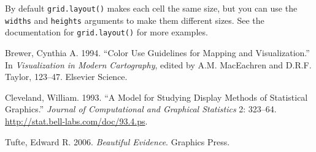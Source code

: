 By default \texttt{grid.layout()} makes each cell the same size, but you
can use the \texttt{widths} and \texttt{heights} arguments to make them
different sizes. See the documentation for \texttt{grid.layout()} for
more examples.

Brewer, Cynthia A. 1994. ``Color Use Guidelines for Mapping and
Visualization.'' In \emph{Visualization in Modern Cartography}, edited
by A.M. MacEachren and D.R.F. Taylor, 123--47. Elsevier Science.

Cleveland, William. 1993. ``A Model for Studying Display Methods of
Statistical Graphics.'' \emph{Journal of Computational and Graphical
Statistics} 2: 323--64. \url{http://stat.bell-labs.com/doc/93.4.ps}.

Tufte, Edward R. 2006. \emph{Beautiful Evidence}. Graphics Press.
